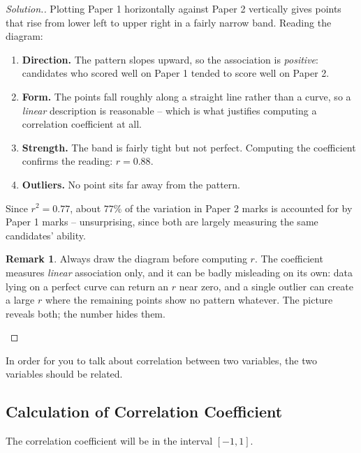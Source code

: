 \documentclass[11pt,a4paper]{article}
\theoremstyle{definition}
\newtheorem{remark}[thm]{Remark}
\newenvironment{solution}
  {\renewcommand{\qedsymbol}{}\begin{proof}[\textit{Solution}.]}
  {\end{proof}}
\begin{document}
\begin{solution}
Plotting Paper 1 horizontally against Paper 2 vertically gives points that rise from lower
left to upper right in a fairly narrow band. Reading the diagram:

\begin{enumerate}
\item[(a).] \textbf{Direction.} The pattern slopes upward, so the association is
\emph{positive}: candidates who scored well on Paper 1 tended to score well on Paper 2.
\item[(b).] \textbf{Form.} The points fall roughly along a straight line rather than a
curve, so a \emph{linear} description is reasonable -- which is what justifies computing a
correlation coefficient at all.
\item[(c).] \textbf{Strength.} The band is fairly tight but not perfect. Computing the
coefficient confirms the reading: $r=0.88$.
\item[(d).] \textbf{Outliers.} No point sits far away from the pattern.
\end{enumerate}

Since $r^2=0.77$, about $77\%$ of the variation in Paper 2 marks is accounted for by Paper
1 marks -- unsurprising, since both are largely measuring the same candidates' ability.

\begin{remark}
Always draw the diagram before computing $r$. The coefficient measures \emph{linear}
association only, and it can be badly misleading on its own: data lying on a perfect curve
can return an $r$ near zero, and a single outlier can create a large $r$ where the remaining
points show no pattern whatever. The picture reveals both; the number hides them.
\end{remark}
\end{solution}
In order for you to talk about correlation between two variables, the two variables should be related.\\[1ex]







\subsection{Calculation of Correlation Coefficient}

The correlation coefficient will be in the interval $[-1,1]$.
\end{document}

